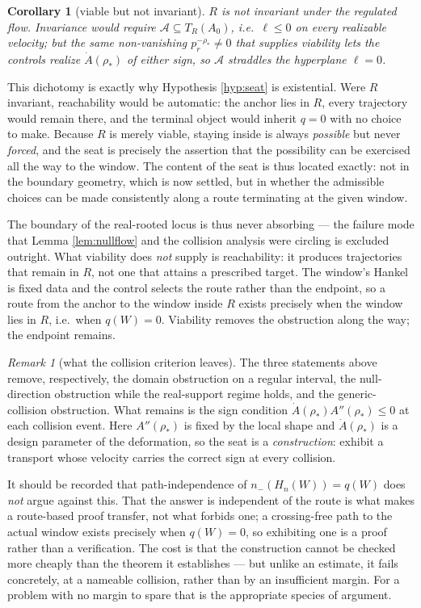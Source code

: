 \documentclass[11pt]{article}
\theoremstyle{plain}
\newtheorem{corollary}[theorem]{Corollary}
\theoremstyle{definition}
\theoremstyle{remark}
\newtheorem{remark}[theorem]{Remark}
\begin{document}
\begin{corollary}[viable but not invariant]\label{cor:notinvariant}
$R$ is not invariant under the regulated flow. Invariance would require
$\mathcal A\subseteq T_R(A_0)$, i.e.\ $\ell\le0$ on every realizable velocity;
but the same non-vanishing $p_r^{-\rho_*}\ne0$ that supplies viability lets the
controls realize $\dot A(\rho_*)$ of either sign, so $\mathcal A$ straddles the
hyperplane $\ell=0$.
\end{corollary}

\noindent This dichotomy is exactly why Hypothesis \ref{hyp:seat} is
existential. Were $R$ invariant, reachability would be automatic: the anchor
lies in $R$, every trajectory would remain there, and the terminal object would
inherit $q=0$ with no choice to make. Because $R$ is merely viable, staying
inside is always \emph{possible} but never \emph{forced}, and the seat is
precisely the assertion that the possibility can be exercised all the way to
the window. The content of the seat is thus located exactly: not in the
boundary geometry, which is now settled, but in whether the admissible choices
can be made consistently along a route terminating at the given window.

\noindent The boundary of the real-rooted locus is thus never absorbing --- the
failure mode that Lemma \ref{lem:nullflow} and the collision analysis were
circling is excluded outright. What viability does \emph{not} supply is
reachability: it produces trajectories that remain in $R$, not one that
attains a prescribed target. The window's Hankel is fixed data and the control
selects the route rather than the endpoint, so a route from the anchor to the
window inside $R$ exists precisely when the window lies in $R$, i.e.\ when
$q(W)=0$. Viability removes the obstruction along the way; the endpoint remains.

\begin{remark}[what the collision criterion leaves]
The three statements above remove, respectively, the domain obstruction on a
regular interval, the null-direction obstruction while the real-support regime
holds, and the generic-collision obstruction. What remains is the sign
condition $\dot A(\rho_*)A''(\rho_*)\le0$ at each collision event. Here
$A''(\rho_*)$ is fixed by the local shape and $\dot A(\rho_*)$ is a design
parameter of the deformation, so the seat is a \emph{construction}: exhibit a
transport whose velocity carries the correct sign at every collision.

It should be recorded that path-independence of $n_-(H_n(W))=q(W)$ does
\emph{not} argue against this. That the answer is independent of the route is
what makes a route-based proof transfer, not what forbids one; a crossing-free
path to the actual window exists precisely when $q(W)=0$, so exhibiting one is
a proof rather than a verification. The cost is that the construction cannot be
checked more cheaply than the theorem it establishes --- but unlike an
estimate, it fails concretely, at a nameable collision, rather than by an
insufficient margin. For a problem with no margin to spare that is the
appropriate species of argument.
\end{remark}
\end{document}
